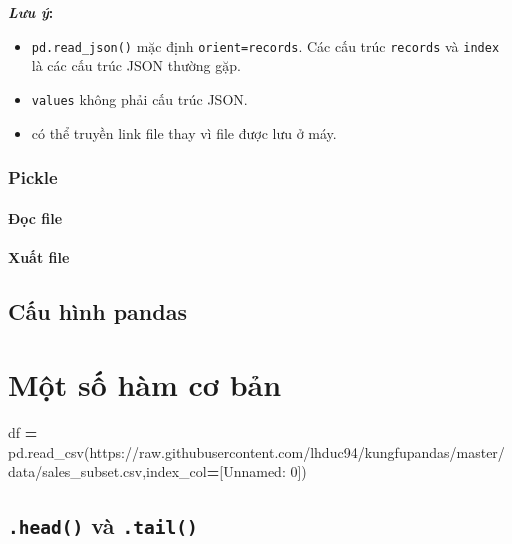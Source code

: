 \documentclass[
]{book}
\makeatletter
\newenvironment{Shaded}{\begin{snugshade}}{\end{snugshade}}
\newcommand{\NormalTok}[1]{#1}
\newcommand{\OperatorTok}[1]{\textcolor[rgb]{0.81,0.36,0.00}{\textbf{#1}}}
\newcommand{\StringTok}[1]{\textcolor[rgb]{0.31,0.60,0.02}{#1}}
\newenvironment{kframe}{%
\medskip{}
\setlength{\fboxsep}{.8em}
 \def\at@end@of@kframe{}%
 \ifinner\ifhmode%
  \def\at@end@of@kframe{\end{minipage}}%
  \begin{minipage}{\columnwidth}%
 \fi\fi%
 \def\FrameCommand##1{\hskip\@totalleftmargin \hskip-\fboxsep
 \colorbox{shadecolor}{##1}\hskip-\fboxsep
     \hskip-\linewidth \hskip-\@totalleftmargin \hskip\columnwidth}%
 \MakeFramed {\advance\hsize-\width
   \@totalleftmargin\z@ \linewidth\hsize
   \@setminipage}}%
 {\par\unskip\endMakeFramed%
 \at@end@of@kframe}
\newenvironment{rmdblock}[1]
  {
  \begin{itemize}
  \renewcommand{\labelitemi}{
    \raisebox{-.7\height}[0pt][0pt]{
      {\setkeys{Gin}{width=3em,keepaspectratio}\texttt{[image: images/\#1]}}
    }
  }
  \setlength{\fboxsep}{1em}
  \begin{kframe}
  \item
  }
  {
  \end{kframe}
  \end{itemize}
  }
\newenvironment{rmdnote}
  {\begin{rmdblock}{note}}
  {\end{rmdblock}}
\makeatother
\begin{document}
\begin{rmdnote}
\textbf{\emph{Lưu ý}:}

\begin{itemize}
\item
  \texttt{pd.read\_json()} mặc định \texttt{orient=\textquotesingle{}records\textquotesingle{}}. Các cấu trúc \texttt{records} và \texttt{index} là các cấu trúc JSON thường gặp.
\item
  \texttt{values} không phải cấu trúc JSON.
\item
  có thể truyền link file thay vì file được lưu ở máy.
\end{itemize}
\end{rmdnote}

\subsection{Pickle}\label{pickle}

\subsubsection{Đọc file}\label{ux111ux1ecdc-file-2}

\subsubsection{Xuất file}\label{xuux1ea5t-file-1}

\section{Cấu hình pandas}\label{cux1ea5u-huxecnh-pandas}

\chapter{Một số hàm cơ bản}\label{Chuong-3}

\begin{Shaded}
\begin{Highlighting}[]
\NormalTok{df }\OperatorTok{=}\NormalTok{ pd.read\_csv(}\StringTok{\textquotesingle{}https://raw.githubusercontent.com/lhduc94/kungfupandas/master/data/sales\_subset.csv\textquotesingle{}}\NormalTok{,index\_col}\OperatorTok{=}\NormalTok{[}\StringTok{\textquotesingle{}Unnamed: 0\textquotesingle{}}\NormalTok{])}
\end{Highlighting}
\end{Shaded}

\section{\texorpdfstring{\texttt{.head()} và \texttt{.tail()}}{.head() và .tail()}}\label{head-vuxe0-.tail}
\end{document}
